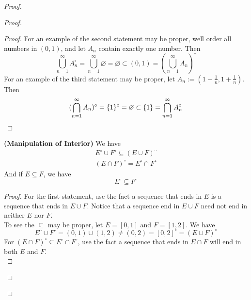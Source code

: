 \documentclass{report}
\begin{document}
\begin{proof}
\begin{proof}
\begin{proof}
For an example of the second statement may be proper, well order all numbers in $(0,1)$, and let $A_n$ contain exactly one number. Then
\begin{equation}
\bigcup_{n=1}^\infty A_n^\circ=\bigcup_{n=1}^\infty \varnothing=\varnothing \subset (0,1)=(\bigcup_{n=1}^\infty A_n)^\circ 
\end{equation}
For an example of the third statement may be proper, let $A_n:=(1-\frac{1}{n},1+\frac{1}{n})$. Then
\begin{equation}
  (\bigcap _{n=1}^\infty A_n)^\circ =\{ 1 \}^\circ =\varnothing \subset \{ 1 \}=\bigcap_{n=1}^\infty A_n^\circ 
\end{equation}
\end{proof}
\begin{theorem}
\label{3.3.4}
\textbf{(Manipulation of Interior)} We have
\begin{gather}
E^\circ \cup F^\circ\subseteq (E\cup F)^\circ\\
(E\cap F)^\circ = E^\circ \cap F^\circ 
\end{gather}
And if $E\subseteq F$, we have
\begin{equation}
E^\circ \subseteq F^\circ 
\end{equation}
\end{theorem}
\begin{proof}
For the first statement, use the fact a sequence that ends in $E$ is a sequence that ends in $E\cup F$. Notice that a sequence end in $E\cup F$ need not end in neither $E$ nor  $F$.\\

To see the $\subseteq$ may be proper, let $E=[0,1]$ and $F=[1,2]$. We have
\begin{equation}
E^\circ \cup F^\circ= (0,1)\cup (1,2)\neq (0,2)=[0,2]^\circ =(E\cup F)^\circ 
\end{equation}
For $(E\cap F)^\circ \subseteq E^\circ \cap F^\circ $, use the fact a sequence that ends in $E\cap F$ will end in both $E$ and  $F$.\\


\end{proof}
\end{proof}
\end{proof}
\end{document}
